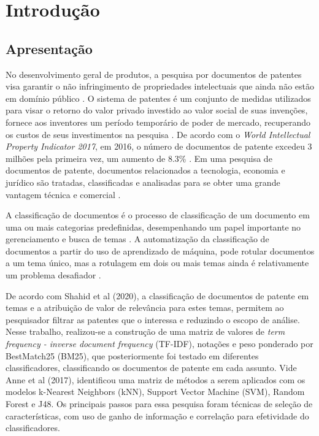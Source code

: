 
\chapter[Introdução]{Introdução}


\section{Apresentação}	

No desenvolvimento geral de produtos, a pesquisa por documentos de patentes visa garantir o não infringimento de propriedades intelectuais que ainda não estão em domínio público \cite{Breitzman2002}.  O sistema de patentes é um conjunto de medidas utilizados para visar o retorno do valor privado investido ao valor social de suas invenções, fornece aos inventores um período temporário de poder de mercado, recuperando os custos de seus investimentos na pesquisa \cite{Williams2017}. De acordo com o \textit{World Intellectual Property Indicator 2017}, em 2016, o número de documentos de patente excedeu 3 milhões pela primeira vez, um aumento de 8.3\% \cite{Li2018}. Em uma pesquisa de documentos de patente, documentos relacionados a tecnologia, economia e jurídico são tratadas, classificadas e analisadas para se obter uma grande vantagem técnica e comercial \cite{Li2018}.

A classificação de documentos é o processo de classificação de um documento em uma ou mais categorias predefinidas, desempenhando um papel importante no gerenciamento e busca de temas \cite{Anne2017}. A automatização da classificação de documentos a partir do uso de aprendizado de máquina, pode rotular documentos a um tema único, mas a rotulagem em dois ou mais temas ainda é relativamente um problema desafiador \cite{Anne2017}.

De acordo com Shahid et al (2020), a classificação de documentos de patente em temas e a atribuição de valor de relevância para estes temas, permitem ao pesquisador filtrar as patentes que o interessa e reduzindo o escopo de análise. Nesse trabalho, realizou-se a construção de uma matriz de valores de \textit{term frequency - inverse document frequency} (TF-IDF), notações e peso ponderado por BestMatch25 (BM25), que posteriormente foi testado em diferentes classificadores, classificando os documentos de patente em cada assunto.
Vide Anne et al (2017), identificou uma matriz de métodos a serem aplicados com os modelos k-Nearest Neighbors (kNN),  Support Vector Machine (SVM), Random Forest e J48. Os principais passos para essa pesquisa foram técnicas de seleção de características, com uso de ganho de informação e correlação para efetividade do classificadores.

